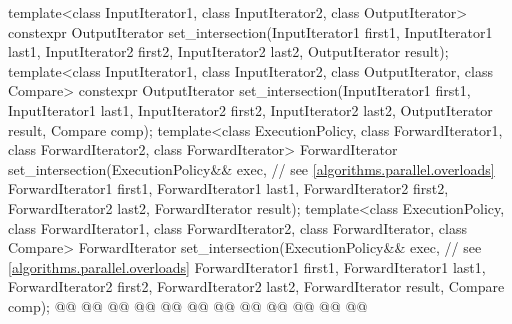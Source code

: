 \begin{codeblock}
{  template<class InputIterator1, class InputIterator2, class OutputIterator>
    constexpr OutputIterator
      set_intersection(InputIterator1 first1, InputIterator1 last1,
                       InputIterator2 first2, InputIterator2 last2,
                       OutputIterator result);
  template<class InputIterator1, class InputIterator2, class OutputIterator, class Compare>
    constexpr OutputIterator
      set_intersection(InputIterator1 first1, InputIterator1 last1,
                       InputIterator2 first2, InputIterator2 last2,
                       OutputIterator result, Compare comp);
  template<class ExecutionPolicy, class ForwardIterator1, class ForwardIterator2,
           class ForwardIterator>
    ForwardIterator
      set_intersection(ExecutionPolicy&& exec, // see \ref{algorithms.parallel.overloads}
                       ForwardIterator1 first1, ForwardIterator1 last1,
                       ForwardIterator2 first2, ForwardIterator2 last2,
                       ForwardIterator result);
  template<class ExecutionPolicy, class ForwardIterator1, class ForwardIterator2,
           class ForwardIterator, class Compare>
    ForwardIterator
      set_intersection(ExecutionPolicy&& exec, // see \ref{algorithms.parallel.overloads}
                       ForwardIterator1 first1, ForwardIterator1 last1,
                       ForwardIterator2 first2, ForwardIterator2 last2,
                       ForwardIterator result, Compare comp);
  @@
    @@
        @@
      @@
      @@
                         @@
    @@
        @@
      @@
      @@
                         @@
  @\added{\}}@

}
\end{codeblock}
